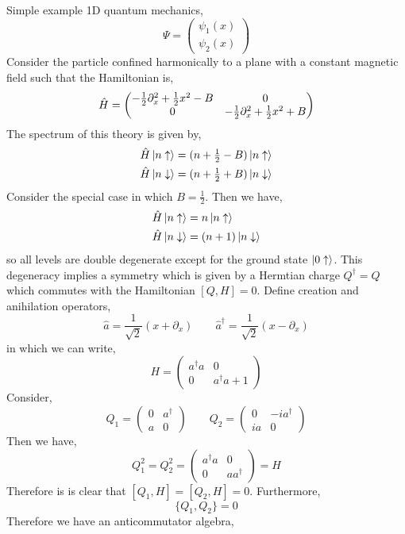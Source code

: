 \documentclass[12pt]{extarticle}
\begin{document}
Simple example 1D quantum mechanics,
\[ \Psi = \begin{pmatrix}
\psi_1(x)
\\
\psi_2(x)
\end{pmatrix} \]
Consider the particle confined harmonically to a plane with a constant magnetic field such that the Hamiltonian is,
\[ \hat{H} = \begin{pmatrix}
- \tfrac{1}{2} \partial_x^2 + \tfrac{1}{2} x^2 - B & 0
\\
0 & -\tfrac{1}{2} \partial_x^2 + \tfrac{1}{2} x^2 + B 
\end{pmatrix} \]
The spectrum of this theory is given by,
\begin{align*}
\hat{H} \left| n \uparrow \right> & = (n + \tfrac{1}{2} - B) \left| n \uparrow \right> \\
\hat{H} \left| n \downarrow \right> & = (n + \tfrac{1}{2} +B) \left| n \downarrow \right> 
\end{align*}
Consider the special case in which $B = \tfrac{1}{2}$. Then we have,
\begin{align*}
\hat{H} \left| n \uparrow \right> & = n \left| n \uparrow \right> \\
\hat{H} \left| n \downarrow \right> & = (n+1) \left| n \downarrow \right> 
\end{align*}
so all levels are double degenerate except for the ground state $\left| 0 \uparrow \right>$. This degeneracy implies a symmetry which is given by a Hermtian charge $Q^\dagger = Q$ which commutes with the Hamiltonian $[Q, H] = 0$. Define creation and anihilation operators,
\[ \hat{a} = \frac{1}{\sqrt{2}} (x + \partial_x) \quad \quad \hat{a}^\dagger = \frac{1}{\sqrt{2}} (x - \partial_x) \]
in which we can write,
\[ H = \begin{pmatrix}
a^\dagger a & 0 
\\
0 & a^\dagger a + 1 
\end{pmatrix} \]
Consider,
\[ Q_1 = 
\begin{pmatrix}
0 & a^\dagger 
\\
a & 0 
\end{pmatrix} \quad \quad Q_2 = 
\begin{pmatrix}
0 & - i a^\dagger
\\
i a & 0
\end{pmatrix} \]
Then we have,
\[ Q_1^2 = Q_2^2 = 
\begin{pmatrix}
a^\dagger a & 0 
\\
0 & a a^\dagger
\end{pmatrix} = H \]
Therefore is is clear that $[Q_1, H] = [Q_2, H] = 0$. Furthermore, 
\[ \{ Q_1, Q_2 \} = 0 \]
Therefore we have an anticommutator algebra,
\end{document}
